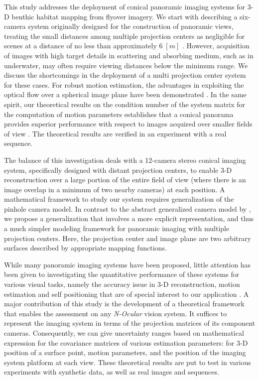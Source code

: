 This study addresses the deployment of conical panoramic imaging systems for 3-D benthic habitat
mapping from flyover imagery. We start with describing a six-camera system originally designed for
the construction of panoramic views, treating the small distances among multiple projection centers
as negligible for scenes at a distance of no less than approximately $6\;[m]$ \cite{neg01}.
However, acquisition of images with high target details in scattering and absorbing medium, such as
in underwater, may often require viewing distances below the minimum range. We discuss the
shortcomings in the deployment of a multi projection center system for these cases. For robust
motion estimation, the advantages in exploiting the optical flow over a spherical image plane have
been demonstrated \cite{nel87}. In the same spirit, our theoretical results on the condition number
of the system matrix for the computation of motion parameters establishes that a conical panorama
provides superior performance with respect to images acquired over smaller fields of view
\cite{fir02}. The theoretical results are verified in an experiment with a real sequence.

The balance of this investigation deals with a 12-camera stereo conical imaging system,
specifically designed with distant projection centers, to enable 3-D reconstruction over a large
portion of the entire field of view (where there is an image overlap in a minimum of two nearby
cameras) at each position. A mathematical framework to study our system requires generalization of
the pinhole camera model. In contrast to the abstract generalized camera model by \cite{gro01}, we
propose a generalization that involves a more explicit representation, and thus a much simpler
modeling framework for panoramic imaging with multiple projection centers. Here, the projection
center and image plane are two arbitrary surfaces described by appropriate mapping functions.

While many panoramic imaging systems have been proposed, little attention has been given to
investigating the quantitative performance of these systems for various visual tasks, namely the
accuracy issue in 3-D reconstruction, motion estimation and self positioning that are of special
interest to our application \cite{fer00,har94,ple03}. A major contribution of this study is the
development of a theoretical framework that enables the assessment on any \emph{N-Ocular} vision
system. It suffices to represent the imaging system in terms of the projection matrices of its
component cameras. Consequently, we can give uncertainty ranges based on mathematical expression
for the covariance matrices of various estimation parameters: for 3-D position of a surface point,
motion parameters, and the position of the imaging system platform at each view. These theoretical
results are put to
test in various experiments with synthetic data, as well as real images and sequences.\\

